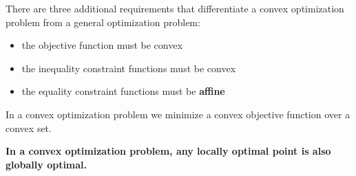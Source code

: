 There are three additional requirements that differentiate a convex optimization problem from a general optimization problem:
{\color{baystate}
	\begin{itemize}
		\item the objective function must be convex
		\item the inequality constraint functions must be convex
		\item the equality constraint functions must be {\color{tiananmen}\textbf{affine}}
	\end{itemize}
}

In a convex optimization problem we minimize a convex objective function over a convex set.

\textbf{In a convex optimization problem, any {\color{tiananmen}\textbf{locally optimal point}} is also {\color{tiananmen}\textbf{globally optimal}}.}